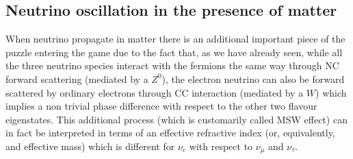 \subsection{Neutrino oscillation in the presence of matter}

When neutrino propagate in matter there is an additional important piece of the
puzzle entering the game due to the fact that, as we have already seen, while all the
three neutrino species interact with the fermions the same way through NC forward
scattering (mediated by a $Z^0$), the electron neutrino can also be forward scattered by
ordinary electrons through CC interaction (mediated by a $W$) which implies a non
trivial phase difference with respect to the other two flavour eigenstates. This
additional process (which is customarily called MSW effect) can in fact be interpreted
in terms of an effective refractive index (or, equivalently, and effective mass)
which is different for $\nu_e$ with respect to $\nu_\mu$ and $\nu_\tau$.


